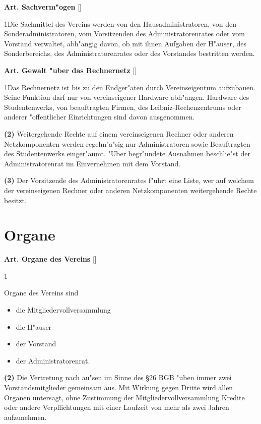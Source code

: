 \documentclass[12pt]{article}
\newcommand{\Abschnitt}[1]{\section{#1}}
\newcommand{\Satz}[2]{

\begin{samepage}
{\bf (#1)} #2
\end{samepage}
}
\newenvironment{Artikel}[2]{
\bigskip \centerline{{\bf Art. #1} [#2]}
\nopagebreak
}{
}
\begin{document}
\begin{Artikel}{12}{Sachverm"ogen}

\Satz{1}{Die Sachmittel des Vereins werden von den Hausadministratoren, von 
den Sonderadministratoren, vom Vorsitzenden des Administratorenrates oder 
vom Vorstand verwaltet, abh"angig davon, ob mit ihnen Aufgaben der H"auser, 
des Sonderbereichs, des Administratorenrates oder des Vorstandes bestritten 
werden.}

\end{Artikel}

\begin{Artikel}{13}{Gewalt "uber das Rechnernetz}

\Satz{1}{Das Rechnernetz ist bis zu den Endger"aten durch Vereinseigentum
aufzubauen. Seine Funktion darf nur von vereinseigener Hardware abh"angen. 
Hardware des Studentenwerks, von beauftragten Firmen, des Leibniz-Rechenzentrums
oder anderer "offentlicher Einrichtungen sind davon ausgenommen.}

\Satz{2}{Weitergehende Rechte auf einem vereinseigenen Rechner oder
anderen Netzkomponenten werden regelm"a"sig nur Administratoren sowie
Beauftragten des Studentenwerks einger"aumt. 
"Uber begr"undete Ausnahmen beschlie"st der Administratorenrat im Einvernehmen
mit dem Vorstand.}

\Satz{3}{Der Vorsitzende des Administratorenrates f"uhrt eine Liste, wer 
auf welchem der vereinseigenen Rechner oder anderen Netzkomponenten 
weitergehende Rechte besitzt.}

\end{Artikel}

\Abschnitt{Organe}

\begin{Artikel}{14}{Organe des Vereins}

\Satz{1}{Organe des Vereins sind  
\begin{itemize}
\item die Mitgliedervollversammlung
\item die H"auser
\item der Vorstand
\item der Administratorenrat.
\end{itemize}}

\Satz{2}{Die Vertretung nach au"sen im Sinne des \S 26 BGB "uben immer zwei
Vorstandsmitglieder gemeinsam aus. Mit Wirkung gegen Dritte wird allen 
Organen untersagt, ohne Zustimmung der Mitgliedervollversammlung 
Kredite oder andere Verpflichtungen mit einer Laufzeit von mehr als zwei Jahren
aufzunehmen.}

\end{Artikel}
\end{document}

